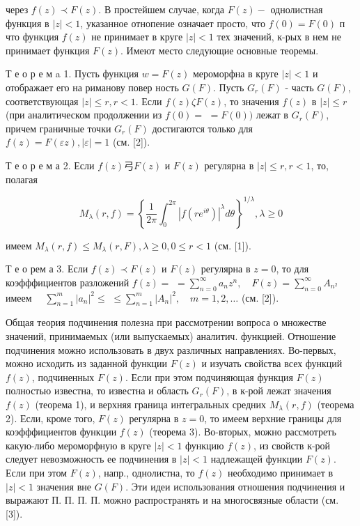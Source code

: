 \documentclass[10pt]{article}
\begin{document}
через $f(z) \prec F(z)$. В простейшем случае, когда $F(z)-$ однолистная функция в $|z|<1$, указанное отнопение означает просто, что $f(0)=F(0)$ п что функция $f(z)$ не принимает в круге $|z|<1$ тех значений, к-рых в нем не принимает функция $F(z)$. Имеют место следующие основные теоремы.



Т е $о$ р е м a 1. Пусть функция $w=F(z)$ мероморфна в круге $|z|<1$ и отображает его на риманову повер ность $G(F)$. Пусть $G_{r}(F)$ - часть $G(F)$, соответствующая $|z| \leqslant r, r<1$. Если $f(z) \zeta F(z)$, то значения $f(z)$ в $|z| \leqslant r$ (при аналитическом продолжении из $f(0)=$ $=F(0))$ лежат в $G_{r}(F)$, причем граничные точки $G_{r}(F)$ достигаются только для $f(z)=F(\varepsilon z),|\varepsilon|=1$ (см. [2]).



Т е о р е м а 2. Если $f(z) 弓 F(z)$ и $F(z)$ регулярна в $|z| \leqslant r, r<1$, то, полагая



\[

M_{\lambda}(r, f)=\left\{\frac{1}{2 \pi} \int_{0}^{2 \pi}\left|f\left(r e^{i \theta}\right)\right|^{\lambda} d \theta\right\}^{1 / \lambda}, \lambda \geqslant 0

\]



имеем $M_{\lambda}(r, f) \leqslant M_{\lambda}(r, F), \lambda \geqslant 0,0 \leqslant r<1$ (см. [1]).



Т е о рем а 3. Если $f(z) \prec F(z)$ и $F(z)$ регулярна в $z=0$, то для коэфффициентов разложений $f(z)=$ $=\sum_{n=0}^{\infty} a_{n} z^{n}, \quad F(z)=\sum_{n=0}^{\infty} A_{n^{2}} \quad$ имеем $\quad \sum_{n=1}^{m}\left|a_{n}\right|^{2} \leqslant$ $\leqslant \sum_{n=1}^{m}\left|A_{n}\right|^{2}, \quad m=1,2, \ldots$ (см. [2]).



Общая теория подчинения полезна при рассмотрении вопроса о множестве значений, принимаемых (или выпускаемых) аналитич. функцией. Отношение подчинения можно использовать в двух различных направлениях. Во-первых, можно исходить из заданной функции $F(z)$ и изучать свойства всех функций $f(z)$, подчиненных $F(z)$. Если при этом подчиняющая функция $F(z)$ полностью известна, то известна и область $G_{r}(F)$, в к-рой лежат значения $f(z)$ (теорема 1), и верхняя граница интегральных средних $M_{\lambda}(r, f)$ (теорема 2). Если, кроме того, $F(z)$ регулярна в $z=0$, то имеем верхние границы для коэфффициентов функции $f(z)$ (теорема 3). Во-вторых, можно рассмотреть какую-либо мероморфную в круге $|z|<1$ функцию $f(z)$, из свойств к-рой следует невозможность ее подчинения в $|z|<1$ надлежащей функции $F(z)$. Если при этом $F(z)$, напр., однолистна, то $f(z)$ необходимо принимает в $|z|<1$ значения вне $G(F)$. Эти идеи использования отношения подчинения и выражают П. П. П. П. можно распространять и на многосвязные области (см. [3]).
\end{document}
